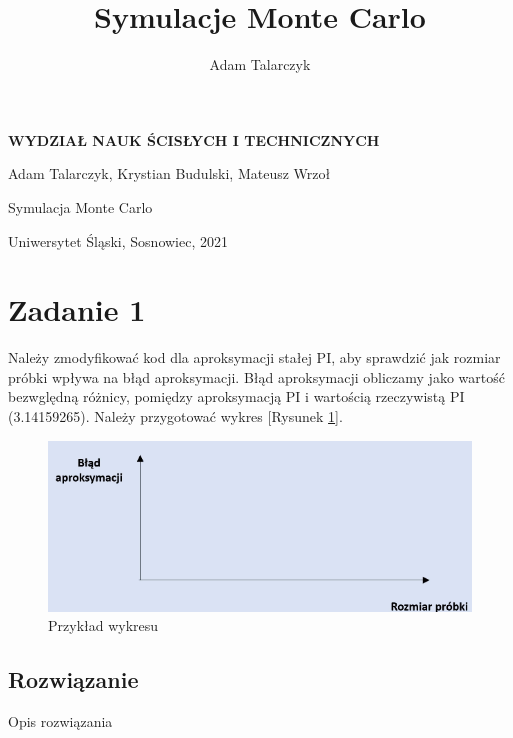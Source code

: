 \documentclass[a4paper,11pt,titlepage]{article}
\author{Adam Talarczyk}
\title{Symulacje Monte Carlo}
\begin{document}
\begin{titlepage}
    \begin{center}

        \Huge
        \textbf{WYDZIAŁ NAUK ŚCISŁYCH I TECHNICZNYCH}

        \vspace{1.5cm}
        \LARGE
        Adam Talarczyk, Krystian Budulski, Mateusz Wrzoł
	\vspace{2cm}
	
	Symulacja Monte Carlo
	
	\vspace{5cm}
        \vfill

        \vspace{0.8cm}
	\Large
        Uniwersytet Śląski, Sosnowiec, 2021

    \end{center}
\end{titlepage}
\newpage

\tableofcontents
\newpage

\section{Zadanie 1}
Należy zmodyfikować kod dla aproksymacji stałej PI, aby sprawdzić jak rozmiar próbki wpływa na błąd aproksymacji. Błąd aproksymacji obliczamy jako wartość bezwględną różnicy, pomiędzy aproksymacją PI i wartością rzeczywistą PI (3.14159265). Należy przygotować wykres [Rysunek \ref{fig:wykres1}].

\begin{figure}[H]
\centering
\includegraphics[width=1\columnwidth]{img/zad1.PNG}
\caption{Przykład wykresu}
\label{fig:wykres1}
\end{figure}

\subsection{Rozwiązanie}
Opis rozwiązania
\end{document}
